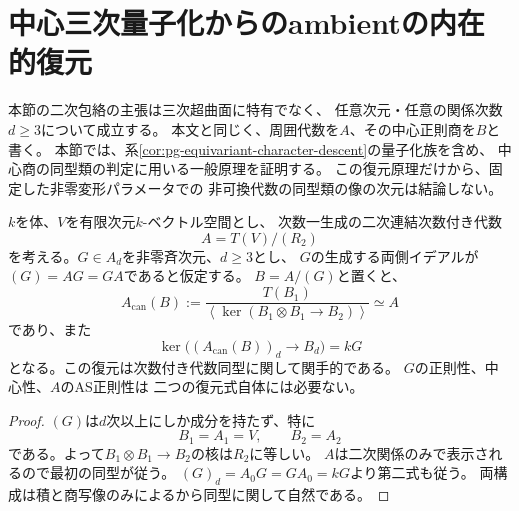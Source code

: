 \section{中心三次量子化からのambientの内在的復元}
\label{sec:pg-ambient-recovery}
本節の二次包絡の主張は三次超曲面に特有でなく、
任意次元・任意の関係次数$d\ge3$について成立する。
本文と同じく、周囲代数を$A$、その中心正則商を$B$と書く。
本節では、系\ref{cor:pg-equivariant-character-descent}の量子化族を含め、
中心商の同型類の判定に用いる一般原理を証明する。
この復元原理だけから、固定した非零変形パラメータでの
非可換代数の同型類の像の次元は結論しない。

\begin{theorem}\label{thm:pg-ambient-recovery-general}
$k$を体、$V$を有限次元$k$-ベクトル空間とし、
次数一生成の二次連結次数付き代数
\begin{equation}\label{eq:pg-ambient-B}
 A=T(V)/(R_2)
\end{equation}
を考える。$G\in A_d$を非零斉次元、$d\ge3$とし、
$G$の生成する両側イデアルが$(G)=AG=GA$であると仮定する。
$B=A/(G)$と置くと、
\begin{equation}\label{eq:pg-ambient-envelope}
 A_{\mathrm{can}}(B):=
 \frac{T(B_1)}{\left\langle
 \ker(B_1\otimes B_1\longrightarrow B_2)\right\rangle}
 \simeq A
\end{equation}
であり、また
\begin{equation}\label{eq:pg-ambient-line}
 \ker\bigl((A_{\mathrm{can}}(B))_d
 \longrightarrow B_d\bigr)=kG
\end{equation}
となる。この復元は次数付き代数同型に関して関手的である。
$G$の正則性、中心性、$A$のAS正則性は
二つの復元式自体には必要ない。
\end{theorem}
\begin{proof}
$(G)$は$d$次以上にしか成分を持たず、特に
\begin{equation}\label{eq:pg-ambient-low}
 B_1=A_1=V,\qquad B_2=A_2
\end{equation}
である。よって$B_1\otimes B_1\to B_2$の核は$R_2$に等しい。
$A$は二次関係のみで表示されるので最初の同型が従う。
$(G)_d=A_0G=GA_0=kG$より第二式も従う。
両構成は積と商写像のみによるから同型に関して自然である。
\end{proof}

